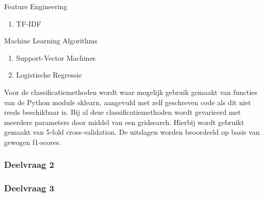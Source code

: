 Feature Engineering
\begin{enumerate}
\item TF-IDF
\end{enumerate} 

Machine Learning Algorithms
\begin{enumerate}
\item Support-Vector Machines
\item Logistische Regressie
\end{enumerate}

Voor de classificatiemethoden wordt waar mogelijk gebruik gemaakt van functies van de Python module sklearn, aangevuld met zelf geschreven code als dit niet reeds beschikbaar is. Bij al deze classificatiemethoden wordt gevarieerd met meerdere parameters door middel van een gridsearch. Hierbij wordt gebruikt gemaakt van 5-fold cross-validation. De uitslagen worden beoordeeld op basis van gewogen f1-scores. 

\subsubsection{Deelvraag 2}

\subsubsection{Deelvraag 3}

